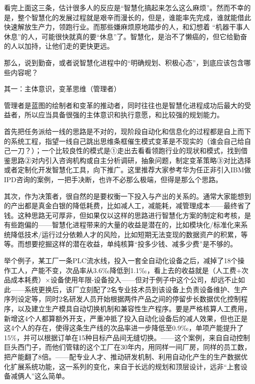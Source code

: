 \documentclass[]{book}
\begin{document}
看完上面这三条，估计很多人的反应是``智慧化搞起来怎么这么麻烦''。然而不幸的是，整个智慧化的发展过程就是艰辛而漫长的，但是，谁能率先完成，谁就能借此快速解放生产力，领跑行业。而那些嫌麻烦原地踏步的人，和幻想着 ``机器干事人休息''的人，可能很快就真的要``休息''了。智慧化，是治不了懒癌的，但它给勤奋的人以加持，让他们走的更快更远。

那么，说到勤奋，或者说智慧化进程中的``明确规划、积极心态''，到底应该包含哪些内容呢？

其一：主体意识，变革思维（管理者）

管理者是蓝图的绘制者和变革的推动者，同时往往也是智慧化进程成功后最大的受益者，所以应当具备很强的主体意识和执行意愿，和比较强的规划能力。

首先把任务派给一线的思路是不对的，现阶段自动化和信息化的过程都是自上而下的系统工程，指望一线自己跳出思维条框催生模式变革是不现实的（谁会自己给自己一刀？）；一个比较良性的模式是①走出去看看领跑行业的现状和模式，找到借鉴思路②对内引入咨询机构或自主分析调研，抽象问题，制定变革策略③对比选择或者定制化开发智慧化工具，向下推广。这里推荐大家参考华为任正非引入IBM做IPD咨询的案例，一把手决断，也许不必那么极端，但得是那么个思路。

其次，作为决策者，很自然的是要权衡一下投入与产出的关系的。通常大家能想到的产出都是真金白银的降低耗费，比如减人工，减能耗，减管理成本------最终省了钱。这种思路无可厚非，但如果仅以这样的思路进行智慧化方案的制定和考核，是有些跑偏的------智慧化进程带来的大量的收益是潜在的，比如模块化/标准化来系统降低技术/运行过分依赖人才的风险，比如短期无法变现的数据资产的积累，等等。而想要挖掘这样的潜在收益，单纯核算``投多少钱、减多少费''是不够的。

举个例子，某工厂一条PLC流水线，投入一套全自动化设备之后，减掉了18个操作工人，产能不变，次品率从3.6‰降低到1.1‰，看上去的收益就是（人工费+次品成本耗费）×设备使用年限-设备投入------但对于例子中这个公司，却远不止如此------系统更换后，该厂立刻配了2名专业技术员到该设备上负责设备维护、生产序列设定等，同时2名研发人员开始根据两件产品之间的停留步长数据优化控制程序，以及建立生产模具自动切换机制和兼容性生产程序。要是严格核算人工费用，新增这4个人都算额外开支，严重冲抵了投入自动化设备后的减人效果，但也正是这4个人的存在，使得这条生产线的次品率进一步降低至0.9‰，单项产能提升了15\%，并可以根据订单在15种目标产品间无缝切换。------这个案例，来自自动控制巨头西门子，而他们管辖的这个工厂在30年内，用同样一间厂房，同样的员工数，把产能翻了8倍。------配专业人才、推动研发机制、利用自动化产生的生产数据优化扩展系统功能，这一系列的变化，来自于长远的规划和顶层设计，远非``上套设备减俩人''这么简单。
\end{document}
